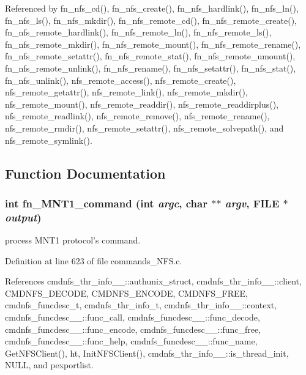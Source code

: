 Referenced by fn\_\-nfs\_\-cd(), fn\_\-nfs\_\-create(), fn\_\-nfs\_\-hardlink(), fn\_\-nfs\_\-ln(), fn\_\-nfs\_\-ls(), fn\_\-nfs\_\-mkdir(), fn\_\-nfs\_\-remote\_\-cd(), fn\_\-nfs\_\-remote\_\-create(), fn\_\-nfs\_\-remote\_\-hardlink(), fn\_\-nfs\_\-remote\_\-ln(), fn\_\-nfs\_\-remote\_\-ls(), fn\_\-nfs\_\-remote\_\-mkdir(), fn\_\-nfs\_\-remote\_\-mount(), fn\_\-nfs\_\-remote\_\-rename(), fn\_\-nfs\_\-remote\_\-setattr(), fn\_\-nfs\_\-remote\_\-stat(), fn\_\-nfs\_\-remote\_\-umount(), fn\_\-nfs\_\-remote\_\-unlink(), fn\_\-nfs\_\-rename(), fn\_\-nfs\_\-setattr(), fn\_\-nfs\_\-stat(), fn\_\-nfs\_\-unlink(), nfs\_\-remote\_\-access(), nfs\_\-remote\_\-create(), nfs\_\-remote\_\-getattr(), nfs\_\-remote\_\-link(), nfs\_\-remote\_\-mkdir(), nfs\_\-remote\_\-mount(), nfs\_\-remote\_\-readdir(), nfs\_\-remote\_\-readdirplus(), nfs\_\-remote\_\-readlink(), nfs\_\-remote\_\-remove(), nfs\_\-remote\_\-rename(), nfs\_\-remote\_\-rmdir(), nfs\_\-remote\_\-setattr(), nfs\_\-remote\_\-solvepath(), and nfs\_\-remote\_\-symlink().

\subsection{Function Documentation}
\subsubsection{\setlength{\rightskip}{0pt plus 5cm}int fn\_\-MNT1\_\-command (int {\em argc}, char $\ast$$\ast$ {\em argv}, FILE $\ast$ {\em output})}\label{commands__NFS_8c_a23}


process MNT1 protocol's command. 

Definition at line 623 of file commands\_\-NFS.c.

References cmdnfs\_\-thr\_\-info\_\-\_\-::authunix\_\-struct, cmdnfs\_\-thr\_\-info\_\-\_\-::client, CMDNFS\_\-DECODE, CMDNFS\_\-ENCODE, CMDNFS\_\-FREE, cmdnfs\_\-funcdesc\_\-t, cmdnfs\_\-thr\_\-info\_\-t, cmdnfs\_\-thr\_\-info\_\-\_\-::context, cmdnfs\_\-funcdesc\_\-\_\-::func\_\-call, cmdnfs\_\-funcdesc\_\-\_\-::func\_\-decode, cmdnfs\_\-funcdesc\_\-\_\-::func\_\-encode, cmdnfs\_\-funcdesc\_\-\_\-::func\_\-free, cmdnfs\_\-funcdesc\_\-\_\-::func\_\-help, cmdnfs\_\-funcdesc\_\-\_\-::func\_\-name, Get\-NFSClient(), ht, Init\-NFSClient(), cmdnfs\_\-thr\_\-info\_\-\_\-::is\_\-thread\_\-init, NULL, and pexportlist.
